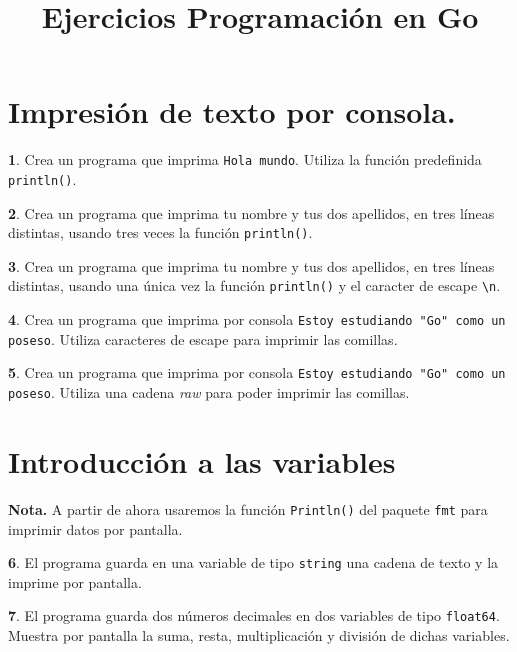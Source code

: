 \documentclass[a4paper, 12pt]{article}
\author{}
\title{Ejercicios Programación en Go}
\theoremstyle{definition}
\newtheorem{ejer}{}[section]
\begin{document}
\section{Impresión de texto por consola.}

\begin{ejer}
Crea un programa que imprima \verb|Hola mundo|. Utiliza la función predefinida \verb|println()|.
\end{ejer}

\begin{ejer}
Crea un programa que imprima tu nombre y tus dos apellidos, en tres líneas distintas, usando tres veces la función \verb|println()|.
\end{ejer}

\begin{ejer}
Crea un programa que imprima tu nombre y tus dos apellidos, en tres líneas distintas, usando una única vez la función \verb|println()| y el caracter de escape \verb|\n|.
\end{ejer}

\begin{ejer}
Crea un programa que imprima por consola \verb|Estoy estudiando "Go" como un poseso|. Utiliza caracteres de escape para imprimir las comillas.
\end{ejer}

\begin{ejer}
Crea un programa que imprima por consola \verb|Estoy estudiando "Go" como un poseso|. Utiliza una cadena \textit{raw} para poder imprimir las comillas.
\end{ejer}

\newpage

\section{Introducción a las variables}

\noindent\textbf{Nota.} A partir de ahora usaremos la función \verb|Println()| del paquete \verb|fmt| para imprimir datos por pantalla.

\bigskip

\begin{ejer}
El programa guarda en una variable de tipo \verb|string| una cadena de texto y la imprime por pantalla.
\end{ejer}

\begin{ejer}
El programa guarda dos números decimales en dos variables de tipo \verb|float64|. Muestra por pantalla la suma, resta, multiplicación y división de dichas variables.
\end{ejer}
\end{document}
